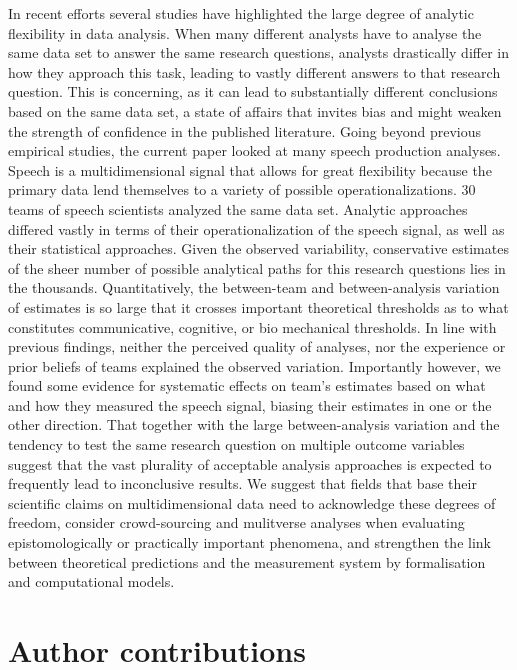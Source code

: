 \documentclass[Review,times,sageh]{sagej}
\begin{document}
In recent efforts several studies have highlighted the large degree of analytic flexibility in data analysis.
When many different analysts have to analyse the same data set to answer the same research questions, analysts drastically differ in how they approach this task, leading to vastly different answers to that research question.
This is concerning, as it can lead to substantially different conclusions based on the same data set, a state of affairs that invites bias and might weaken the strength of confidence in the published literature.
Going beyond previous empirical studies, the current paper looked at many speech production analyses.
Speech is a multidimensional signal that allows for great flexibility because the primary data lend themselves to a variety of possible operationalizations.
30 teams of speech scientists analyzed the same data set.
Analytic approaches differed vastly in terms of their operationalization of the speech signal, as well as their statistical approaches.
Given the observed variability, conservative estimates of the sheer number of possible analytical paths for this research questions lies in the thousands.
Quantitatively, the between-team and between-analysis variation of estimates is so large that it crosses important theoretical thresholds as to what constitutes communicative, cognitive, or bio mechanical thresholds.
In line with previous findings, neither the perceived quality of analyses, nor the experience or prior beliefs of teams explained the observed variation.
Importantly however, we found some evidence for systematic effects on team's estimates based on what and how they measured the speech signal, biasing their estimates in one or the other direction.
That together with the large between-analysis variation and the tendency to test the same research question on multiple outcome variables suggest that the vast plurality of acceptable analysis approaches is expected to frequently lead to inconclusive results.
We suggest that fields that base their scientific claims on multidimensional data need to acknowledge these degrees of freedom, consider crowd-sourcing and mulitverse analyses when evaluating epistomologically or practically important phenomena, and strengthen the link between theoretical predictions and the measurement system by formalisation and computational models.

\hypertarget{author-contributions}{%
\section{Author contributions}\label{author-contributions}}
\end{document}
